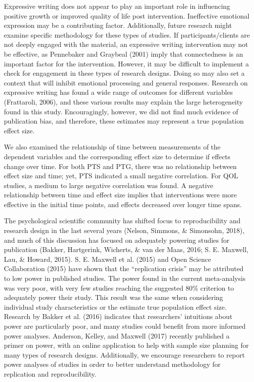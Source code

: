 \documentclass[english,man]{apa6}
\theoremstyle{definition}
\theoremstyle{definition}
\theoremstyle{definition}
\theoremstyle{remark}
\begin{document}
Expressive writing does not appear to play an important role in
influencing positive growth or improved quality of life post
intervention. Ineffective emotional expression may be a contributing
factor. Additionally, future research might examine specific methodology
for these types of studies. If participants/clients are not deeply
engaged with the material, an expressive writing intervention may not be
effective, as Pennebaker and Graybeal (2001) imply that connectedness is
an important factor for the intervention. However, it may be difficult
to implement a check for engagement in these types of research designs.
Doing so may also set a context that will inhibit emotional processing
and general responses. Research on expressive writing has found a wide
range of outcomes for different variables (Frattaroli, 2006), and these
various results may explain the large heterogeneity found in this study.
Encouragingly, however, we did not find much evidence of publication
bias, and therefore, these estimates may represent a true population
effect size.

We also examined the relationship of time between measurements of the
dependent variables and the corresponding effect size to determine if
effects change over time. For both PTS and PTG, there was no
relationship between effect size and time; yet, PTS indicated a small
negative correlation. For QOL studies, a medium to large negative
correlation was found. A negative relationship between time and effect
size implies that interventions were more effective in the initial time
points, and effects decreased over longer time spans.

The psychological scientific community has shifted focus to
reproducibility and research design in the last several years (Nelson,
Simmons, \& Simonsohn, 2018), and much of this discussion has focused on
adequately powering studies for publication (Bakker, Hartgerink,
Wicherts, \& van der Maas, 2016; S. E. Maxwell, Lau, \& Howard, 2015).
S. E. Maxwell et al. (2015) and Open Science Collaboration (2015) have
shown that the \enquote{replication crisis} may be attributed to low
power in published studies. The power found in the current meta-analysis
was very poor, with very few studies reaching the suggested 80\%
criterion to adequately power their study. This result was the same when
considering individual study characteristics or the estimate true
population effect size. Research by Bakker et al. (2016) indicates that
researchers' intuitions about power are particularly poor, and many
studies could benefit from more informed power analyses. Anderson,
Kelley, and Maxwell (2017) recently published a primer on power, with an
online application to help with sample size planning for many types of
research designs. Additionally, we encourage researchers to report power
analyses of studies in order to better understand methodology for
replication and reproducibility.
\end{document}
